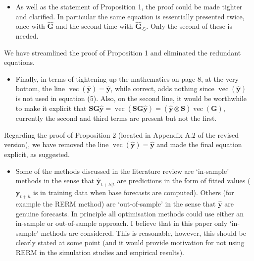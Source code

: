 \documentclass[11pt,a4paper,]{article}
\providecommand{\tightlist}{%
  \setlength{\itemsep}{0pt}\setlength{\parskip}{0pt}}
\renewenvironment{quote}
               {\list{}{\rightmargin\leftmargin}%
                \item\relax\color[RGB]{0,150,0}}
               {\endlist}
\begin{document}
\begin{itemize}
\tightlist
\item
  As well as the statement of Proposition 1, the proof could be made
  tighter and clarified. In particular the same equation is essentially
  presented twice, once with \(\hat{\bm{G}}\) and the second time with
  \(\hat{\bm{G}}_{\cdot \mathbb{S}}\). Only the second of these is
  needed.
\end{itemize}

\begin{quote}
We have streamlined the proof of Proposition 1 and eliminated the
redundant equations.
\end{quote}

\begin{itemize}
\tightlist
\item
  Finally, in terms of tightening up the mathematics on page 8, at the
  very bottom, the line
  \(\operatorname{vec}(\hat{\bm{y}})=\hat{\bm{y}}\), while correct, adds
  nothing since \(\operatorname{vec}(\hat{\bm{y}})\) is not used in
  equation (5). Also, on the second line, it would be worthwhile to make
  it explicit that
  \(\bm{SG}\hat{\bm{y}}=\operatorname{vec}(\bm{SG}\hat{\bm{y}})=(\hat{\bm{y}} \otimes \bm{S}) \operatorname{vec}(\bm{G})\),
  currently the second and third terms are present but not the first.
\end{itemize}

\begin{quote}
Regarding the proof of Proposition 2 (located in Appendix A.2 of the
revised version), we have removed the line
\(\operatorname{vec}(\hat{\bm{y}})=\hat{\bm{y}}\) and made the final
equation explicit, as suggested.
\end{quote}

\begin{itemize}
\tightlist
\item
  Some of the methods discussed in the literature review are `in-sample'
  methods in the sense that \(\hat{\bm{y}}_{t+h|t}\) are predictions in
  the form of fitted values (\(\bm{y}_{t+h}\) is in training data when
  base forecasts are computed). Others (for example the RERM method) are
  `out-of-sample' in the sense that \(\hat{\bm{y}}\) are genuine
  forecasts. In principle all optimisation methods could use either an
  in-sample or out-of-sample approach. I believe that in this paper only
  `in-sample' methods are considered. This is reasonable, however, this
  should be clearly stated at some point (and it would provide
  motivation for not using RERM in the simulation studies and empirical
  results).
\end{itemize}
\end{document}
